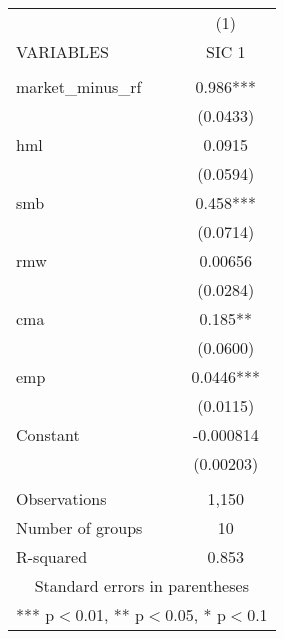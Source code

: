 \begin{tabular}{lc} \hline
 & (1) \\
VARIABLES & SIC 1 \\ \hline
 &  \\
market\_minus\_rf & 0.986*** \\
 & (0.0433) \\
hml & 0.0915 \\
 & (0.0594) \\
smb & 0.458*** \\
 & (0.0714) \\
rmw & 0.00656 \\
 & (0.0284) \\
cma & 0.185** \\
 & (0.0600) \\
emp & 0.0446*** \\
 & (0.0115) \\
Constant & -0.000814 \\
 & (0.00203) \\
 &  \\
Observations & 1,150 \\
Number of groups & 10 \\
 R-squared & 0.853 \\ \hline
\multicolumn{2}{c}{ Standard errors in parentheses} \\
\multicolumn{2}{c}{ *** p$<$0.01, ** p$<$0.05, * p$<$0.1} \\
\end{tabular}
